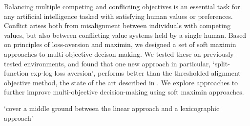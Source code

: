 
Balancing multiple competing and conflicting objectives is an essential task for any artificial intelligence tasked with satisfying human values or preferences. Conflict arises both from misalignment between individuals with competing values, but also between conflicting value systems held by a single human. Based on principles of loss-aversion and maximin, we designed a set of soft maximin approaches to multi-objective decison-making. We tested these on previously-tested environments, and found that one new approach in particular, `split-function exp-log loss aversion', performs better than the thresholded alignment objective method, the state of the art described in \cite{vamplew_potential-based_2021}. We explore approaches to further improve multi-objective decision-making using soft maximin approaches.

`cover a middle ground between the linear approach and a lexicographic approach'